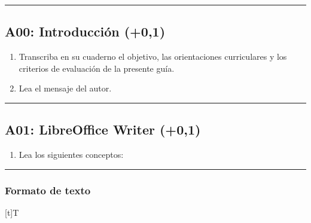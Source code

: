 \documentclass[letterpaper,10pt,spanish]{sphinxmanual}
\let\sphinxpxdimen\pdfpxdimen\else\newdimen\sphinxpxdimen
\begin{document}
\bigskip\hrule\bigskip



\subsection{A00: Introducción (+0,1)}
\label{\detokenize{1_guias/10ofimatica/G1014:a00-introduccion-0-1}}
\sphinxAtStartPar
{}
\begin{enumerate}
%
\item {} 
\sphinxAtStartPar
Transcriba en su cuaderno el objetivo, las orientaciones curriculares y los criterios de evaluación de la presente guía.

\item {} 
\sphinxAtStartPar
Lea el mensaje del autor.

\end{enumerate}


\bigskip\hrule\bigskip



\subsection{A01: LibreOffice Writer (+0,1)}
\label{\detokenize{1_guias/10ofimatica/G1014:a01-libreoffice-writer-0-1}}
\sphinxAtStartPar
{}
\begin{enumerate}
%
\item {} 
\sphinxAtStartPar
Lea los siguientes conceptos:

\end{enumerate}


\bigskip\hrule\bigskip



\subsubsection{Formato de texto}
\label{\detokenize{1_guias/10ofimatica/G1014:formato-de-texto}}

\begin{savenotes}\sphinxattablestart
\sphinxthistablewithglobalstyle
\centering
\begin{tabulary}{\linewidth}[t]{T}
\sphinxtoprule
\sphinxtableatstartofbodyhook

\begin{sphinxfigure-in-table}
\centering
\capstart
\noindent\sphinxincludegraphics[width=700\sphinxpxdimen]{{image018}.png}
\label{\detokenize{1_guias/10ofimatica/G1014:id1}}\end{sphinxfigure-in-table}\relax
\\
\sphinxbottomrule
\end{tabulary}
\sphinxtableafterendhook\par
\sphinxattableend\end{savenotes}
\end{document}
